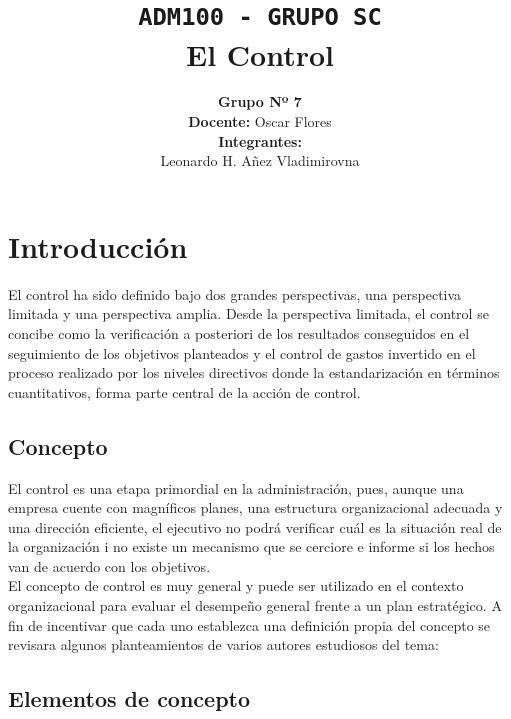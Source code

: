 \documentclass[10pt,letterpaper]{book}
\author{
{\Large \textbf{Grupo Nº 7}}\\${ }$\\
\textbf{Docente:} Oscar Flores \\${ }$\\
\textbf{Integrantes:}\\
Leonardo H. Añez Vladimirovna
}
\title{
{\large \texttt{ADM100 - GRUPO SC}}\\\vspace{3cm}
{\Huge El Control}
}
\begin{document}
\maketitle
\tableofcontents

\newpage

\section{Introducción}
El control ha sido definido bajo dos grandes perspectivas, una perspectiva limitada y una perspectiva amplia. Desde la perspectiva limitada, el control se concibe como la verificación a posteriori de los resultados conseguidos en el seguimiento de los objetivos planteados y el control de gastos invertido en el proceso realizado por los niveles directivos donde la estandarización en términos cuantitativos, forma parte central de la acción de control.
\subsection{Concepto}
El control es una etapa primordial en la administración, pues, aunque una empresa cuente con magníficos planes, una estructura organizacional adecuada y una dirección eficiente, el ejecutivo no podrá verificar cuál es la situación real de la organización i no existe un mecanismo que se cerciore e informe si los hechos van de acuerdo con los objetivos.\\${ }$\\
El concepto de control es muy general y puede ser utilizado en el contexto organizacional para evaluar el desempeño general frente a un plan estratégico.
A fin de incentivar que cada uno establezca una definición propia del concepto se revisara algunos planteamientos de varios autores estudiosos del tema:
\subsection{Elementos de concepto}
\end{document}
